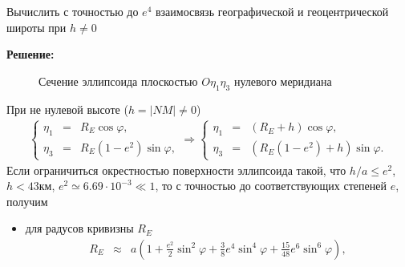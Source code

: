 \documentclass[a4paper,14pt]{article}
\theoremstyle{plain} %
\theoremstyle{definition} %
\theoremstyle{remark} %
\begin{document}
{Вычислить с точностью до $e^4$ взаимосвязь географической и геоцентрической широты при $h\neq0$

\textbf{Решение:}

\begin{figure}[htb]
    \caption{Сечение эллипсоида плоскостью $O\eta_1\eta_3$ нулевого меридиана}
    \label{fig:picture}
\end{figure}
При не нулевой высоте ($h = |NM| \ne 0$)
\begin{eqnarray*}
    \left\{
    \begin{array}{ccc}
        \eta_1   & = & R_E\cos \varphi ,                      \\
        \eta_{3} & = & R_{E}\left(1 -e^2\right) \sin \varphi,
    \end{array}
    \right.
    \Rightarrow
    \left\{
    \begin{array}{ccc}
        \eta_1   & = & (R_E + h) \cos \varphi,                                \\
        \eta_{3} & = & \left(R_{E}\left(1 -e^2\right) + h\right)\sin \varphi.
    \end{array}
    \right.
\end{eqnarray*}
Если ограничиться окрестностью поверхности эллипсоида такой, что
$h/a \le e^2 $,  $h < 43 \mbox{км}$, $e^2 \simeq 6.69\cdot 10^{-3} \ll 1$,
то с точностью до соответствующих степеней $e$, получим
\begin{itemize}
    \item
          для радусов кривизны $R_E$
          \begin{eqnarray*}
              R_E &\approx&
              a\left( 1 +  \frac{e^2}{2}\sin^2\varphi +\frac{3}{8}e^4\sin^4\varphi +\frac{15}{48}e^6\sin^6\varphi\right), \nonumber \\
          \end{eqnarray*}


\end{itemize}}
\end{document}
